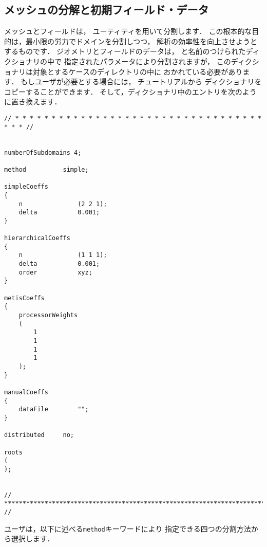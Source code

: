 \subsection{メッシュの分解と初期フィールド・データ}
\label{ssec:3.4.1}
%
%
%
%
メッシュとフィールドは，
%
%
ユーティティを用いて分割します．
この根本的な目的は，最小限の労力でドメインを分割しつつ，
解析の効率性を向上させようとするものです．
ジオメトリとフィールドのデータは，
%
%
と名前のつけられたディクショナリの中で
指定されたパラメータにより分割されますが，
このディクショナリは対象とするケースのディレクトリの中に
おかれている必要があります．
もしユーザが必要とする場合には，
チュートリアルから
ディクショナリをコピーすることができます．
そして，ディクショナリ中のエントリを次のように置き換えます．
\begin{OFfile}
\begin{verbatim}
// * * * * * * * * * * * * * * * * * * * * * * * * * * * * * * * * * * * * * //


numberOfSubdomains 4;

method          simple;

simpleCoeffs
{
    n               (2 2 1);
    delta           0.001;
}

hierarchicalCoeffs
{
    n               (1 1 1);
    delta           0.001;
    order           xyz;
}

metisCoeffs
{
    processorWeights
    (
        1
        1
        1
        1
    );
}

manualCoeffs
{
    dataFile        "";
}

distributed     no;

roots
(
);


// ************************************************************************* //
\end{verbatim}
\end{OFfile}
ユーザは，以下に述べる\verb|method|キーワードにより
指定できる四つの分割方法から選択します．

